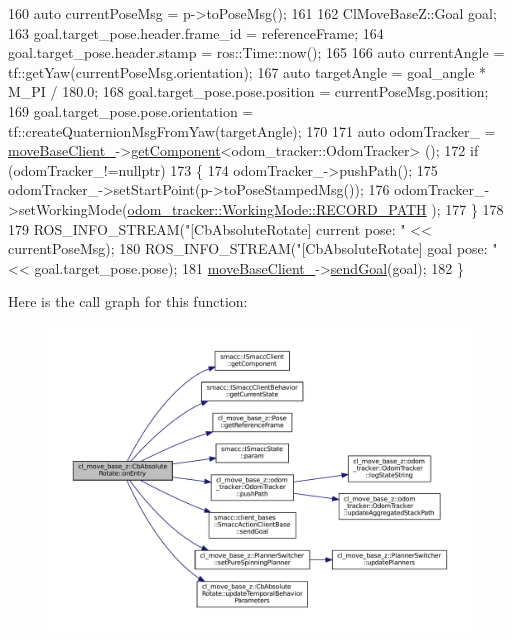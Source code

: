 \begin{DoxyCode}
160     \textcolor{keyword}{auto} currentPoseMsg = p->toPoseMsg();
161 
162     ClMoveBaseZ::Goal goal;
163     goal.target\_pose.header.frame\_id = referenceFrame;
164     goal.target\_pose.header.stamp = ros::Time::now();
165 
166     \textcolor{keyword}{auto} currentAngle = tf::getYaw(currentPoseMsg.orientation);
167     \textcolor{keyword}{auto} targetAngle = goal\_angle * M\_PI / 180.0;
168     goal.target\_pose.pose.position = currentPoseMsg.position;
169     goal.target\_pose.pose.orientation = tf::createQuaternionMsgFromYaw(targetAngle);
170 
171     \textcolor{keyword}{auto} odomTracker\_ = \hyperlink{classcl__move__base__z_1_1CbMoveBaseClientBehaviorBase_ab2ef219464cfac8659b4a87c8d0db6d5}{moveBaseClient\_}->\hyperlink{classsmacc_1_1ISmaccClient_adef78db601749ca63c19e74a27cb88cc}{getComponent}<odom\_tracker::OdomTracker>
      ();
172     \textcolor{keywordflow}{if} (odomTracker\_!=\textcolor{keyword}{nullptr})
173     \{
174         odomTracker\_->pushPath();
175         odomTracker\_->setStartPoint(p->toPoseStampedMsg());
176         odomTracker\_->setWorkingMode(\hyperlink{namespacecl__move__base__z_1_1odom__tracker_ac46b05813b2791604f6cd0a39ace3ef8a023bc3adf68871ef7a0c616765ac80a7}{odom\_tracker::WorkingMode::RECORD\_PATH}
      );
177     \}
178 
179     ROS\_INFO\_STREAM(\textcolor{stringliteral}{"[CbAbsoluteRotate] current pose: "} << currentPoseMsg);
180     ROS\_INFO\_STREAM(\textcolor{stringliteral}{"[CbAbsoluteRotate] goal pose: "} << goal.target\_pose.pose);
181     \hyperlink{classcl__move__base__z_1_1CbMoveBaseClientBehaviorBase_ab2ef219464cfac8659b4a87c8d0db6d5}{moveBaseClient\_}->\hyperlink{classsmacc_1_1client__bases_1_1SmaccActionClientBase_a9c47a5094ac8afb01680307fe5eca922}{sendGoal}(goal);
182 \}
\end{DoxyCode}
Here is the call graph for this function\+:
\nopagebreak
\begin{figure}[H]
\begin{center}
\leavevmode
\includegraphics[width=350pt]{classcl__move__base__z_1_1CbAbsoluteRotate_a10418ea360809fa649d295716b152b2b_cgraph}
\end{center}
\end{figure}
